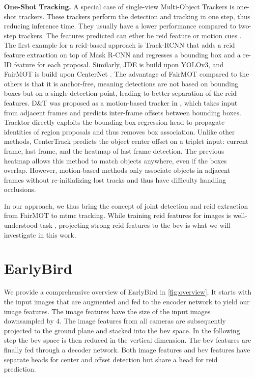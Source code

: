 \documentclass[10pt,twocolumn,letterpaper]{article}
\newcommand{\nparagraph}[1]{\noindent\textbf{#1.  }}
\def\sname{EarlyBird\xspace}
\begin{document}
\nparagraph{One-Shot Tracking}
A special case of single-view Multi-Object Trackers is one-shot trackers. These trackers perform the detection and tracking in one step, thus reducing inference time. They usually have a lower performance compared to two-step trackers. The features predicted can ether be \gls{reid} feature \cite{zhang2021fairmot, Voigtlaender19mots, wang2020towards} or motion cues \cite{zhou2020tracking, bergmann2019tracking, feichtenhofer2017detect}. The first example for a \gls{reid}-based approach is Track-RCNN \cite{Voigtlaender19mots} that adds a \gls{reid} feature extraction on top of Mask R-CNN \cite{he2017mask} and regresses a bounding box and a re-ID feature for each proposal. Similarly, JDE \cite{wang2020towards} is build upon YOLOv3\cite{redmon2018yolov3}, and FairMOT is build upon CenterNet \cite{zhou2019objects}. The advantage of FairMOT compared to the others is that it is anchor-free, meaning detections are not based on bounding boxes but on a single detection point, leading to better separation of the \gls{reid} features.
D\&T was proposed as a motion-based tracker in  \cite{feichtenhofer2017detect}, which takes input from adjacent frames and predicts inter-frame offsets between bounding boxes. Tracktor \cite{bergmann2019tracking} directly exploits the bounding box regression head to propagate identities of region proposals and thus removes box association. Unlike other methods, CenterTrack \cite{zhou2020tracking} predicts the object center offset on a triplet input: current frame, last frame, and the heatmap of last frame detection. The previous heatmap allows this method to match objects anywhere, even if the boxes overlap.
However, motion-based methods only associate objects in adjacent frames without re-initializing lost tracks and thus have difficulty handling occlusions.

In our approach, we thus bring the concept of joint detection and \gls{reid} extraction from FairMOT \cite{zhang2021fairmot} to \gls{mtmc} tracking. While training \gls{reid} features for images is well-understood task \cite{herzog2021lightweight, zhang2021fairmot, Voigtlaender19mots, wang2020towards}, projecting strong \gls{reid} features to the \gls{bev} is what we will investigate in this work.
 \section{EarlyBird}\label{sec:main}

We provide a comprehensive overview of \sname in \cref{fig:overview}. It starts with the input images that are augmented and fed to the encoder network to yield our image features. The image features have the size of the input images downsampled by 4. The image features from all cameras are subsequently projected to the ground plane and stacked into the \gls{bev} space. In the following step the \gls{bev} space is then reduced in the vertical dimension. The \gls{bev} features are finally fed through a decoder network. Both image features and \gls{bev} features have separate heads for center and offset detection but share a head for \gls{reid} prediction. 
\end{document}

